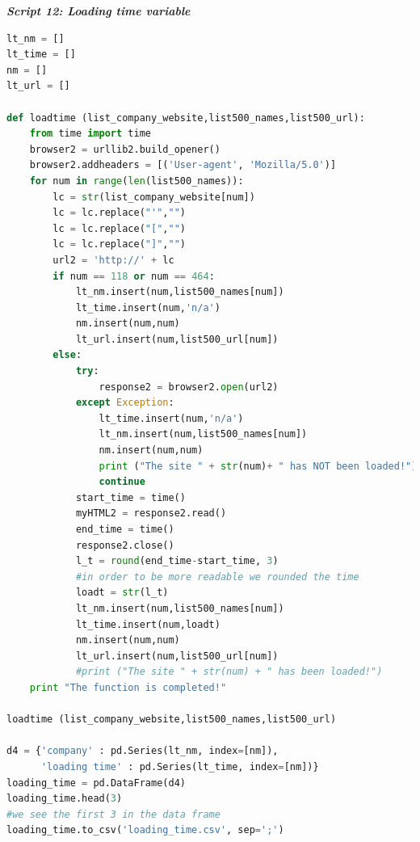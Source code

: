 \documentclass{book}
\begin{document}
\begin{center}
\textit{\textbf{Script 12: Loading time variable}}\label{p12}
\end{center}
\begin{lstlisting}[language=Python]
lt_nm = [] 
lt_time = []
nm = []
lt_url = []

def loadtime (list_company_website,list500_names,list500_url):
    from time import time
    browser2 = urllib2.build_opener()
    browser2.addheaders = [('User-agent', 'Mozilla/5.0')]
    for num in range(len(list500_names)):
        lc = str(list_company_website[num])        
        lc = lc.replace("'","")   
        lc = lc.replace("[","")
        lc = lc.replace("]","")
        url2 = 'http://' + lc
        if num == 118 or num == 464:            
            lt_nm.insert(num,list500_names[num])            
            lt_time.insert(num,'n/a')
            nm.insert(num,num)
            lt_url.insert(num,list500_url[num])           
        else:
            try:
                response2 = browser2.open(url2)
            except Exception:
                lt_time.insert(num,'n/a')
                lt_nm.insert(num,list500_names[num])  
                nm.insert(num,num)
                print ("The site " + str(num)+ " has NOT been loaded!")
                continue     
            start_time = time()
            myHTML2 = response2.read()
            end_time = time()
            response2.close()
            l_t = round(end_time-start_time, 3) 
            #in order to be more readable we rounded the time
            loadt = str(l_t)
            lt_nm.insert(num,list500_names[num])            
            lt_time.insert(num,loadt)
            nm.insert(num,num)
            lt_url.insert(num,list500_url[num])
            #print ("The site " + str(num) + " has been loaded!")
    print "The function is completed!"

loadtime (list_company_website,list500_names,list500_url)

d4 = {'company' : pd.Series(lt_nm, index=[nm]),
      'loading time' : pd.Series(lt_time, index=[nm])}
loading_time = pd.DataFrame(d4)    
loading_time.head(3) 
#we see the first 3 in the data frame
loading_time.to_csv('loading_time.csv', sep=';')
\end{lstlisting}
\end{document}
